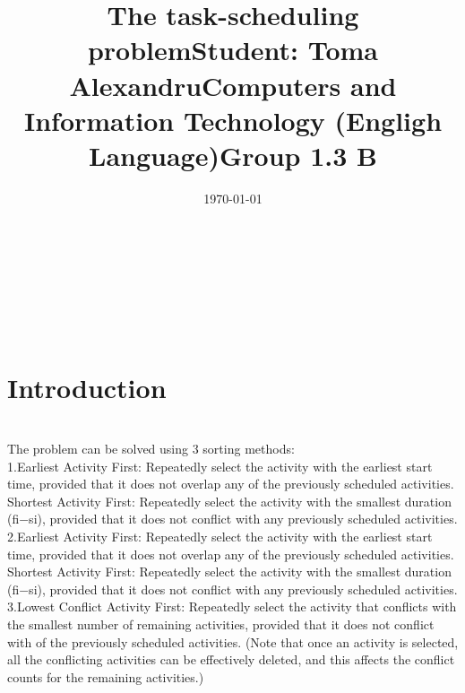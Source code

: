 \documentclass[14pt]{article}
\begin{document}
\title{\huge The task-scheduling problem}
\date{\today}
\maketitle
\begin{center}
\vspace{30 mm}

\title{\huge Student: Toma Alexandru}
\\\vspace{10 mm}
\title{\huge Computers and Information Technology (Engligh Language)}
\\\vspace{10 mm}
\title{\huge Group 1.3 B}
\\\vspace{10 mm}

\date{}
\maketitle

\newpage
\section*{Introduction}

\\\vspace{10 mm}
The problem can be solved using 3 sorting methods:
\\
1.Earliest Activity First: Repeatedly select the activity with the earliest start time, provided
that it does not overlap any of the previously scheduled activities.
Shortest Activity First: Repeatedly select the activity with the smallest duration (fi−si),
provided that it does not conflict with any previously scheduled activities.
\\
2.Earliest Activity First: Repeatedly select the activity with the earliest start time, provided
that it does not overlap any of the previously scheduled activities.
Shortest Activity First: Repeatedly select the activity with the smallest duration (fi−si),
provided that it does not conflict with any previously scheduled activities.
\\
3.Lowest Conflict Activity First: Repeatedly select the activity that conflicts with the
smallest number of remaining activities, provided that it does not conflict with of the
previously scheduled activities. (Note that once an activity is selected, all the conflicting
activities can be effectively deleted, and this affects the conflict counts for the remaining
activities.)
\newpage
\end{center}
\end{document}
